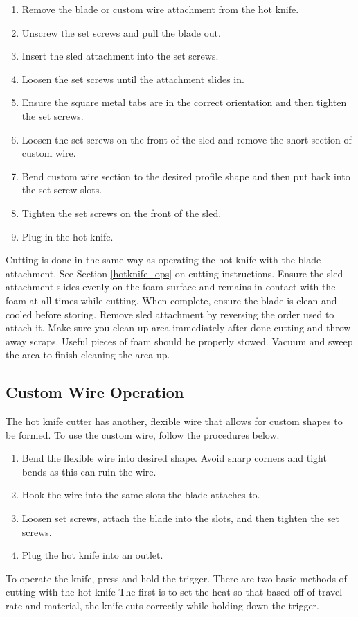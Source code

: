\begin{enumerate}
\item Remove the blade or custom wire attachment from the hot knife.
\item Unscrew the set screws and pull the blade out.
\item Insert the sled attachment into the set screws.
\item Loosen the set screws until the attachment slides in.
\item Ensure the square metal tabs are in the correct orientation and then tighten the set screws.
\item Loosen the set screws on the front of the sled and remove the short section of custom wire.
\item Bend custom wire section to the desired profile shape and then put back into the set screw slots.
\item Tighten the set screws on the front of the sled.
\item Plug in the hot knife.
\end{enumerate}

Cutting is done in the same way as operating the hot knife with the blade attachment. See Section \ref{hotknife_ops} on cutting instructions.  Ensure the sled attachment slides evenly on the foam surface and remains in contact with the foam at all times while cutting.  When complete, ensure the blade is clean and cooled before storing.  Remove sled attachment by reversing the order used to attach it.
Make sure you clean up area immediately after done cutting and throw away scraps.  Useful pieces of foam should be properly stowed.  Vacuum and sweep the area to finish cleaning the area up.  

\subsection{Custom Wire Operation}
The hot knife cutter has another, flexible wire that allows for custom shapes to be formed.  To use the custom wire, follow the procedures below.

\begin{enumerate}
\item Bend the flexible wire into desired shape.  Avoid sharp corners and tight bends as this can ruin the wire.
\item Hook the wire into the same slots the blade attaches to.
\item Loosen set screws, attach the blade into the slots, and then tighten the set screws.
\item Plug the hot knife into an outlet.
\end{enumerate}
To operate the knife, press and hold the trigger.  There are two basic methods of cutting with the hot knife
The first is to set the heat so that based off of travel rate and material, the knife cuts correctly while holding down the trigger.


